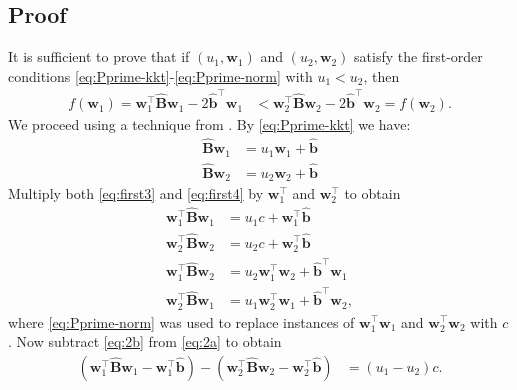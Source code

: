 \documentclass[journal,twoside]{IEEEtran}
\begin{document}
\subsection{Proof}
It is sufficient to prove that if $(u_1,\mathbf{w}_1)$ and $(u_2,\mathbf{w}_2)$ satisfy the first-order conditions \eqref{eq:Pprime-kkt}-\eqref{eq:Pprime-norm} with $u_1 < u_2$, then
\begin{align*}
f(\mathbf{w}_1) = \mathbf{w}_1^\top \hat{\mathbf{B}} \mathbf{w}_1 - 2\hat{\mathbf{b}}^\top \mathbf{w}_1 &< \mathbf{w}_2^\top \hat{\mathbf{B}} \mathbf{w}_2 - 2\hat{\mathbf{b}}^\top \mathbf{w}_2 = f(\mathbf{w}_2).
\end{align*}
We proceed using a technique from \cite{gander1989}. By \eqref{eq:Pprime-kkt} we have:
\begin{subequations}
\begin{align}
\label{eq:first3} \hat{\mathbf{B}}\mathbf{w}_1 &= u_1 \mathbf{w}_1 + \hat{\mathbf{b}} \\
\label{eq:first4} \hat{\mathbf{B}}\mathbf{w}_2 &= u_2 \mathbf{w}_2 + \hat{\mathbf{b}}
\end{align}
\end{subequations}
Multiply both \eqref{eq:first3} and \eqref{eq:first4} by $\mathbf{w}_1^\top$ and $\mathbf{w}_2^\top$ to obtain
\begin{subequations}
\begin{align}
\label{eq:2a}\mathbf{w}_1^\top \hat{\mathbf{B}} \mathbf{w}_1 &= u_1 c + \mathbf{w}_1^\top \hat{\mathbf{b}} \\
\label{eq:2b}\mathbf{w}_2^\top \hat{\mathbf{B}} \mathbf{w}_2 &= u_2 c + \mathbf{w}_2^\top \hat{\mathbf{b}} \\
\label{eq:2c}\mathbf{w}_1^\top \hat{\mathbf{B}} \mathbf{w}_2 &= u_2\mathbf{w}_1^\top \mathbf{w}_2 + \hat{\mathbf{b}}^\top \mathbf{w}_1 \\
\label{eq:2d}\mathbf{w}_2^\top \hat{\mathbf{B}} \mathbf{w}_1 &= u_1\mathbf{w}_2^\top \mathbf{w}_1 + \hat{\mathbf{b}}^\top \mathbf{w}_2,
\end{align}
\end{subequations}
where \eqref{eq:Pprime-norm} was used to replace instances of $\mathbf{w}_1^\top \mathbf{w}_1$ and $\mathbf{w}_2^\top \mathbf{w}_2$ with $c$. Now subtract \eqref{eq:2b} from \eqref{eq:2a} to obtain
\begin{align*}
(\mathbf{w}_1^\top \hat{\mathbf{B}} \mathbf{w}_1 - \mathbf{w}_1^\top \hat{\mathbf{b}}) - (\mathbf{w}_2^\top \hat{\mathbf{B}} \mathbf{w}_2 - \mathbf{w}_2^\top \hat{\mathbf{b}}) &= (u_1 - u_2)c.
\end{align*}
\end{document}
